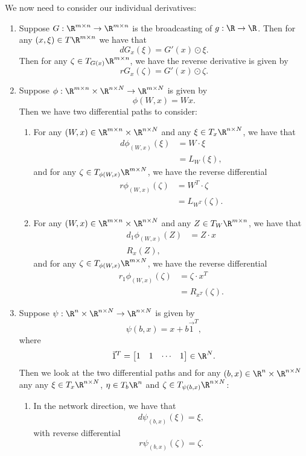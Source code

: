 We now need to consider our individual derivatives:
\begin{enumerate}
	\item Suppose $G:\R^{m\times n}\to\R^{m\times n}$ is the broadcasting of $g:\R\to\R$.  Then for any $(x,\xi)\in T\R^{m\times n}$ we have that
	$$dG_x(\xi)=G'(x)\odot\xi.$$
	Then for any $\zeta\in T_{G(x)}\R^{m\times n}$, we have the reverse derivative is given by
	$$rG_x(\zeta)=G'(x)\odot\zeta.$$
	
	\item Suppose $\phi:\R^{m\times n}\times\R^{n\times N}\to\R^{m\times N}$ is given by
	$$\phi(W,x)=Wx.$$
	Then we have two differential paths to consider:
	\begin{enumerate}
		\item For any $(W,x)\in \R^{m\times n}\times \R^{n\times N}$ and any $\xi\in T_x\R^{n\times N}$, we have that
		\begin{align*}
			d\phi_{(W,x)}(\xi)&=W\cdot\xi\\
			&=L_W(\xi),
		\end{align*}
		and for any $\zeta\in T_{\phi(W,x)}\R^{m\times N}$, we have the reverse differential
		\begin{align*}
			r\phi_{(W,x)}(\zeta)&=W^T\cdot\zeta\\
			&=L_{W^T}(\zeta).
		\end{align*}
		
		\item For any $(W,x)\in\R^{m\times n}\times \R^{n\times N}$ and any $Z\in T_W\R^{m\times n}$, we have that
		\begin{align*}
			d_1\phi_{(W,x)}(Z)&=Z\cdot x\\
			R_x(Z),
		\end{align*}
		and for any $\zeta\in T_{\phi(W,x)}\R^{m\times N}$, we have the reverse differential
		\begin{align*}
			r_1\phi_{(W,x)}(\zeta)&=\zeta\cdot x^T\\
			&=R_{x^T}(\zeta).
		\end{align*}
	\end{enumerate}
	
	\item Suppose $\psi:\R^n\times\R^{n\times N}\to\R^{n\times N}$ is given by
	$$\psi(b,x)=x+b\vec{1}^T,$$
	where
	$$\vec{1}^T=\begin{bmatrix}
		1&1&\cdots&1
	\end{bmatrix}\in\R^N.$$
	Then we look at the two differential paths and for any $(b,x)\in\R^n\times\R^{n\times N}$ any any $\xi\in T_x\R^{n\times N}$, $\eta\in T_b\R^n$ and $\zeta\in T_{\psi(b,x)}\R^{n\times N}$:
	\begin{enumerate}
		\item In the network direction, we have that
		\begin{align*}
			d\psi_{(b,x)}(\xi)=\xi,
		\end{align*}
		with reverse differential
		$$r\psi_{(b,x)}(\zeta)=\zeta.$$
		

\end{enumerate}
\end{enumerate}
